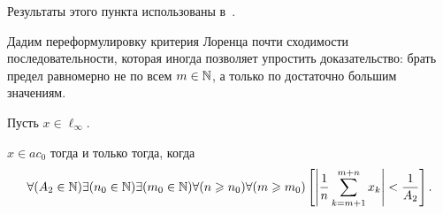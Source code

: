 Результаты этого пункта использованы в~\cite{our-mz2019ac0}.

Дадим переформулировку критерия Лоренца
\cite{lorentz1948contribution,bennett1974consistency}
почти сходимости последовательности,
которая иногда позволяет упростить доказательство:
брать предел равномерно не по всем $m\in \N$,
а только по достаточно большим значениям.


\begin{theorem}
	\label{thm:Lorentz_mod}
	Пусть $x\in\ell_\infty$.

	$x\in ac_0$ тогда и только тогда, когда
	\begin{equation}\label{crit_pos_ac0}
		\forall(A_2\in\N)
		\exists(n_0\in\N)
		\exists(m_0\in\N)
		\forall(n\geq n_0)
		\forall(m\geq m_0)
		\\
		\left[
			\left|
			\frac{1}{n}
			\sum_{k=m+1}^{m+n} x_k
			\right|
			<
			\frac{1}{A_2}
		\right]
		.
	\end{equation}

\end{theorem}

